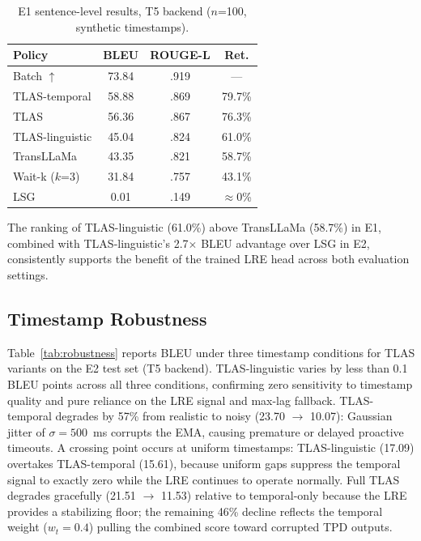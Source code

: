 \documentclass[conference]{IEEEtran}
\begin{document}
\begin{table}[t]
\centering
\caption{E1 sentence-level results, T5 backend ($n$=100, synthetic timestamps).}
\label{tab:e1}
\small
\begin{tabular}{lccc}
\toprule
\textbf{Policy} & \textbf{BLEU} & \textbf{ROUGE-L} & \textbf{Ret.} \\
\midrule
Batch $\uparrow$  & 73.84 & .919 & --- \\
\midrule
TLAS-temporal     & 58.88 & .869 & 79.7\% \\
TLAS              & 56.36 & .867 & 76.3\% \\
TLAS-linguistic   & 45.04 & .824 & 61.0\% \\
TransLLaMa        & 43.35 & .821 & 58.7\% \\
Wait-k ($k$=3)    & 31.84 & .757 & 43.1\% \\
LSG               &  0.01 & .149 & $\approx$0\% \\
\bottomrule
\end{tabular}
\end{table}

The ranking of TLAS-linguistic (61.0\%) above TransLLaMa (58.7\%) in E1, combined with TLAS-linguistic's 2.7$\times$ BLEU advantage over LSG in E2, consistently supports the benefit of the trained LRE head across both evaluation settings.

\subsection{Timestamp Robustness}

Table~\ref{tab:robustness} reports BLEU under three timestamp conditions for TLAS variants on the E2 test set (T5 backend). TLAS-linguistic varies by less than 0.1 BLEU points across all three conditions, confirming zero sensitivity to timestamp quality and pure reliance on the LRE signal and max-lag fallback. TLAS-temporal degrades by 57\% from realistic to noisy (23.70 $\to$ 10.07): Gaussian jitter of $\sigma=500$~ms corrupts the EMA, causing premature or delayed proactive timeouts. A crossing point occurs at uniform timestamps: TLAS-linguistic (17.09) overtakes TLAS-temporal (15.61), because uniform gaps suppress the temporal signal to exactly zero while the LRE continues to operate normally. Full TLAS degrades gracefully (21.51 $\to$ 11.53) relative to temporal-only because the LRE provides a stabilizing floor; the remaining 46\% decline reflects the temporal weight ($w_t=0.4$) pulling the combined score toward corrupted TPD outputs.
\end{document}

